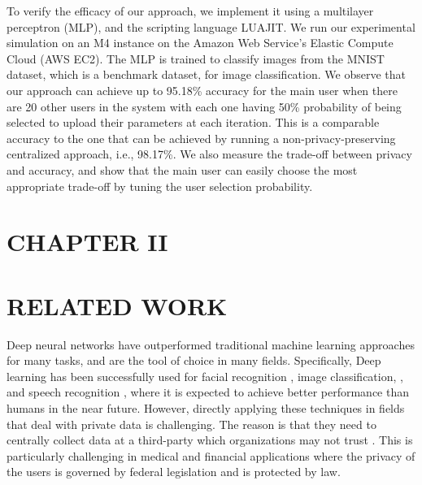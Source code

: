 \documentclass[letterpaper]{article}
\begin{document}
\begin{flushleft}
{To verify the efficacy of our approach, we implement it using a multilayer perceptron (MLP), and the scripting language
LUAJIT. We run our experimental simulation on an M4 instance on the Amazon Web Service's Elastic Compute Cloud (AWS EC2). 
The MLP is trained to  classify images from the MNIST dataset, which is a benchmark dataset,  for image classification.
We observe that our approach can achieve up to 95.18\%  accuracy for the main user when there are 20 other users in the
system with each one having 50\% probability of being selected to upload their parameters at each iteration. 
This is a comparable accuracy to the one that can be achieved by running a non-privacy-preserving centralized approach, i.e.,  98.17\%.
We also measure the trade-off between privacy and accuracy, and show that the main user can easily choose the most appropriate
trade-off by tuning the user selection probability. 





\pagebreak



\section*{CHAPTER II}


\vspace{0.25in}
\section{RELATED WORK}
Deep neural networks have outperformed traditional machine learning approaches for many tasks, and are the tool of choice in many
fields. Specifically, Deep learning has been successfully used for facial recognition \cite{krizhevsky2012imagenet, sun2014deep, ding2015robust}, image classification, 
\cite{simard2003best, ma2015hyperspectral, zhong2011bilinear}, and speech recognition \cite{hinton2012deep, graves2013speech, noda2015audio}, where it is expected to achieve better
performance than humans in the near future. However, directly applying these techniques in fields that deal with private data is
challenging. The reason is that they need to centrally collect data at a third-party which organizations may not trust
\cite{chicurel2000databasing}. This is particularly challenging in medical and financial applications where the privacy of the users is
governed by federal legislation and is protected by law. 

}
\end{flushleft}
\end{document}
